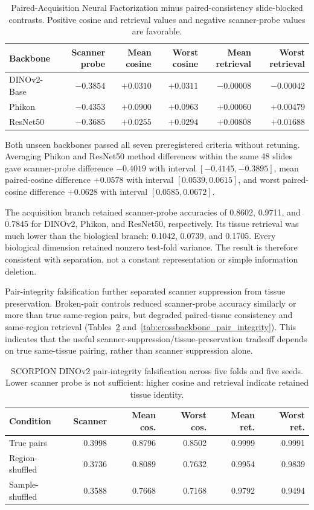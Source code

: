 \documentclass[10pt]{article}
\begin{document}
\begin{table}[t]
\centering
\caption{Paired-Acquisition Neural Factorization minus paired-consistency slide-blocked contrasts. Positive cosine and retrieval values and negative scanner-probe values are favorable.}
\small
\begin{tabular}{lrrrrr}
\toprule
Backbone & Scanner probe & Mean cosine & Worst cosine & Mean retrieval & Worst retrieval \\
\midrule
DINOv2-Base & $-0.3854$ & $+0.0310$ & $+0.0311$ & $-0.00008$ & $-0.00042$ \\
Phikon & $-0.4353$ & $+0.0900$ & $+0.0963$ & $+0.00060$ & $+0.00479$ \\
ResNet50 & $-0.3685$ & $+0.0255$ & $+0.0294$ & $+0.00808$ & $+0.01688$ \\
\bottomrule
\end{tabular}
\label{tab:crossbackbone}
\end{table}

Both unseen backbones passed all seven preregistered criteria without retuning. Averaging Phikon and ResNet50 method differences within the same 48 slides gave scanner-probe difference $-0.4019$ with interval $[-0.4145,-0.3895]$, mean paired-cosine difference $+0.0578$ with interval $[0.0539,0.0615]$, and worst paired-cosine difference $+0.0628$ with interval $[0.0585,0.0672]$.

The acquisition branch retained scanner-probe accuracies of 0.8602, 0.9711, and 0.7845 for DINOv2, Phikon, and ResNet50, respectively. Its tissue retrieval was much lower than the biological branch: 0.1042, 0.0739, and 0.1705. Every biological dimension retained nonzero test-fold variance. The result is therefore consistent with separation, not a constant representation or simple information deletion.

Pair-integrity falsification further separated scanner suppression from tissue preservation. Broken-pair controls reduced scanner-probe accuracy similarly or more than true same-region pairs, but degraded paired-tissue consistency and same-region retrieval (Tables~\ref{tab:pair_integrity} and~\ref{tab:crossbackbone_pair_integrity}). This indicates that the useful scanner-suppression/tissue-preservation tradeoff depends on true same-tissue pairing, rather than scanner suppression alone.

\begin{table}[t]
\centering
\caption{SCORPION DINOv2 pair-integrity falsification across five folds and five seeds. Lower scanner probe is not sufficient: higher cosine and retrieval indicate retained tissue identity.}
\scriptsize
\setlength{\tabcolsep}{2.2pt}
\begin{tabular}{@{}lrrrrr@{}}
\toprule
Condition & Scanner & Mean cos. & Worst cos. & Mean ret. & Worst ret. \\
\midrule
True pairs & 0.3998 & 0.8796 & 0.8502 & 0.9999 & 0.9991 \\
Region-shuffled & 0.3736 & 0.8089 & 0.7632 & 0.9954 & 0.9839 \\
Sample-shuffled & 0.3588 & 0.7668 & 0.7168 & 0.9792 & 0.9494 \\
\bottomrule
\end{tabular}
\label{tab:pair_integrity}
\end{table}
\end{document}
